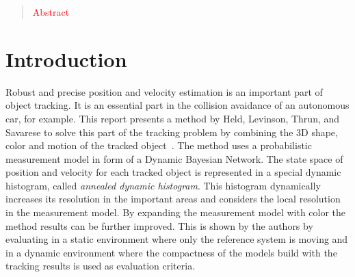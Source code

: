 \documentclass[twoside,a4paper,article]{combine}
\begin{document}


\begin{abstract}
  \textcolor{red}{Abstract}
\end{abstract}

\tableofcontents
\newpage

\section{Introduction}
\label{sec:intro}
Robust and precise position and velocity estimation is an important
part of object tracking. It is an essential part in the collision
avaidance of an autonomous car, for example. This report presents a
method by Held, Levinson, Thrun, and Savarese to solve this part of
the tracking problem by combining the 3D shape, color and motion of
the tracked object~\cite{paper}. The method uses a probabilistic
measurement model in form of a Dynamic Bayesian Network. The state
space of position and velocity for each tracked object is represented
in a special dynamic histogram, called \textit{annealed dynamic
  histogram}. This histogram dynamically increases its resolution in
the important areas and considers the local resolution in the
measurement model. By expanding the measurement model with color the
method results can be further improved. This is shown by the authors
by evaluating in a static environment where only the reference system
is moving and in a dynamic environment where the compactness of the
models build with the tracking results is used as evaluation criteria. 
\end{document}
